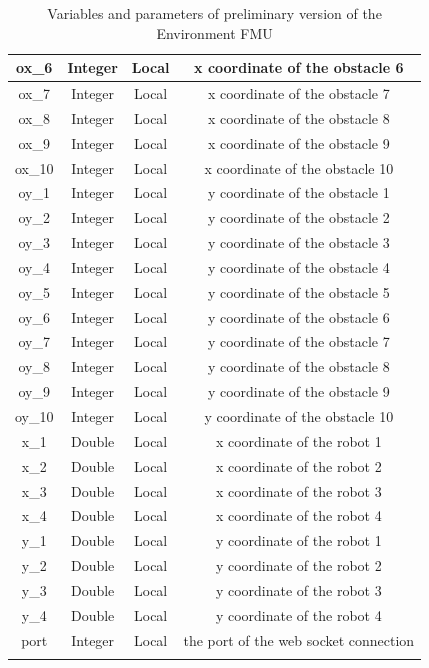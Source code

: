 \documentclass[english]{article}
\begin{document}
\begin{longtable}{|c|c|c|c|}
	ox\_6 & Integer & Local & x coordinate of the obstacle 6 \\ \hline
	ox\_7 & Integer & Local & x coordinate of the obstacle 7 \\ \hline
	ox\_8 & Integer & Local & x coordinate of the obstacle 8 \\ \hline
	ox\_9 & Integer & Local & x coordinate of the obstacle 9 \\ \hline
	ox\_10 & Integer & Local & x coordinate of the obstacle 10 \\ \hline
	oy\_1 & Integer & Local & y coordinate of the obstacle 1 \\ \hline
	oy\_2 & Integer & Local & y coordinate of the obstacle 2 \\ \hline
	oy\_3 & Integer & Local & y coordinate of the obstacle 3 \\ \hline
	oy\_4 & Integer & Local & y coordinate of the obstacle 4 \\ \hline
	oy\_5 & Integer & Local & y coordinate of the obstacle 5 \\ \hline
	oy\_6 & Integer & Local & y coordinate of the obstacle 6 \\ \hline
	oy\_7 & Integer & Local & y coordinate of the obstacle 7 \\ \hline
	oy\_8 & Integer & Local & y coordinate of the obstacle 8 \\ \hline
	oy\_9 & Integer & Local & y coordinate of the obstacle 9 \\ \hline
	oy\_10 & Integer & Local & y coordinate of the obstacle 10 \\ \hline
	x\_1 & Double & Local & x coordinate of the robot 1 \\ \hline
	x\_2 & Double & Local & x coordinate of the robot 2 \\ \hline
	x\_3 & Double & Local & x coordinate of the robot 3 \\ \hline
	x\_4 & Double & Local & x coordinate of the robot 4 \\ \hline
	y\_1 & Double & Local & y coordinate of the robot 1 \\ \hline
	y\_2 & Double & Local & y coordinate of the robot 2 \\ \hline
	y\_3 & Double & Local & y coordinate of the robot 3 \\ \hline
	y\_4 & Double & Local & y coordinate of the robot 4 \\ \hline
	port & Integer & Local & the port of the web socket connection \\ \hline
	\caption{Variables and parameters of preliminary version of the Environment FMU}
	\label{tab:label1}
\end{longtable}
\end{document}
